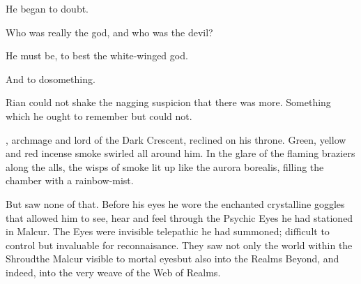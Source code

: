 \begin{garbage}
He began to doubt. 

Who was really the god, and who was the devil? 

He must be, to best the white-winged god. 

And to do\prikker something. 

Rian could not shake the 
nagging suspicion that there was more. Something which he ought to remember but could not. 










\begin{comment}
\subsection{\Nithdornazsh}
\end{comment}

% 
% 

\LocarPsyrex{}, archmage and lord of the Dark Crescent, reclined on his throne. 
Green, yellow and red incense smoke swirled all around him. 
In the glare of the flaming braziers along the alls, the wisps of smoke lit up like the aurora borealis, filling the chamber with a rainbow-\coloured mist. 

But \Psyrex{} saw none of that. 
Before his eyes he wore the enchanted crystalline goggles that allowed him to see, hear and feel through the Psychic Eyes he had stationed in Malcur. 
The Eyes were invisible telepathic \daemons{} he had summoned; difficult to control but invaluable for reconnaisance. 
They saw not only the world within the Shroud\dash the Malcur visible to mortal eyes\dash but also into the Realms Beyond, and indeed, into the very weave of the Web of Realms. 


\end{garbage}

